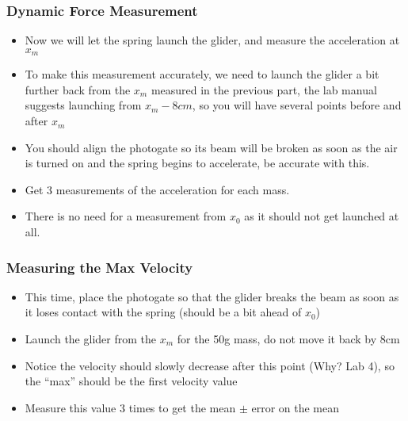\documentclass[handout,aspectratio=169]{beamer}
\begin{document}
\begin{frame}
  \frametitle{Dynamic Force Measurement}
  \begin{itemize}
  \item Now we will let the spring launch the glider, and measure the acceleration at $x_m$
  \item To make this measurement accurately, we need to launch the glider a bit further back from the $x_m$ measured in the previous part, the lab manual suggests launching from $x_m-8cm$, so you will have several points before and after $x_m$
  \item You should align the photogate so its beam will be broken as soon as the air is turned on and the spring begins to accelerate, be accurate with this.
  \item Get 3 measurements of the acceleration for each mass.
  \item There is no need for a measurement from $x_0$ as it should not get launched at all.
  \end{itemize}
\end{frame}

\begin{frame}
  \frametitle{Measuring the Max Velocity}
  \begin{itemize}
  \item This time, place the photogate so that the glider breaks the beam as soon as it loses contact with the spring (should be a bit ahead of $x_0$)
  \item Launch the glider from the $x_m$ for the 50g mass, do not move it back by 8cm
  \item Notice the velocity should slowly decrease after this point (Why? Lab 4), so the ``max'' should be the first velocity value
  \item Measure this value 3 times to get the mean $\pm$ error on the mean
  \end{itemize}
\end{frame}
\end{document}
